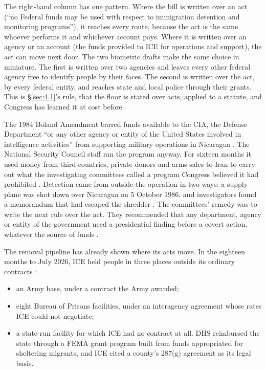 The right-hand column has one pattern. Where the bill is written over an act (“no Federal funds may be used with respect to immigration detention and monitoring programs”), it reaches every route, because the act is the same whoever performs it and whichever account pays. Where it is written over an agency or an account (the funds provided to ICE for operations and support), the act can move next door. The two biometric drafts make the same choice in miniature. The first is written over two agencies and leaves every other federal agency free to identify people by their faces. The second is written over the act, by every federal entity, and reaches state and local police through their grants. This is \S\ref{sec:4.1}'s rule, that the floor is stated over acts, applied to a statute, and Congress has learned it at cost before.

The 1984 Boland Amendment barred funds available to the CIA, the Defense Department “or any other agency or entity of the United States involved in intelligence activities” from supporting military operations in Nicaragua \autocite[§8066(a)]{boland1984}. The National Security Council staff ran the program anyway. For sixteen months it used money from third countries, private donors and arms sales to Iran to carry out what the investigating committees called a program Congress believed it had prohibited \autocite{irancontra1987}. Detection came from outside the operation in two ways: a supply plane was shot down over Nicaragua on 5 October 1986, and investigators found a memorandum that had escaped the shredder \autocite{irancontra1987}. The committees' remedy was to write the next rule over the act. They recommended that any department, agency or entity of the government need a presidential finding before a covert action, whatever the source of funds \autocite{irancontra1987}.

The removal pipeline has already shown where its acts move. In the eighteen months to July 2026, ICE held people in three places outside its ordinary contracts \autocite{gao2026detention}:

\begin{itemize}
\item an Army base, under a contract the Army awarded;
\item eight Bureau of Prisons facilities, under an interagency agreement whose rates ICE could not negotiate;
\item a state-run facility for which ICE had no contract at all. DHS reimbursed the state through a FEMA grant program built from funds appropriated for sheltering migrants, and ICE cited a county's 287(g) agreement as its legal basis.
\end{itemize}

